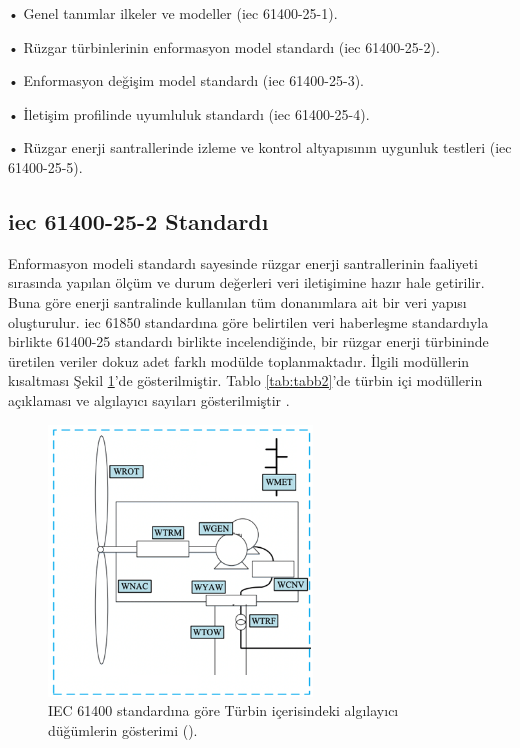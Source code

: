 •	Genel tanımlar ilkeler ve modeller (\gls{iec} 61400-25-1).

•	Rüzgar türbinlerinin enformasyon model standardı (\gls{iec} 61400-25-2).

•	Enformasyon değişim model standardı (\gls{iec} 61400-25-3).

•	İletişim profilinde uyumluluk standardı (\gls{iec} 61400-25-4).

•	Rüzgar enerji santrallerinde izleme ve kontrol altyapısının uygunluk testleri (\gls{iec} 61400-25-5).


\subsection{\gls{iec} 61400-25-2 Standardı}

Enformasyon modeli standardı sayesinde rüzgar enerji santrallerinin faaliyeti sırasında yapılan ölçüm ve durum değerleri veri iletişimine hazır hale getirilir. Buna göre enerji santralinde kullanılan tüm donanımlara ait bir veri yapısı oluşturulur. \gls{iec} 61850 standardına göre belirtilen veri haberleşme standardıyla birlikte 61400-25 standardı birlikte incelendiğinde, bir rüzgar enerji türbininde üretilen veriler dokuz adet farklı modülde toplanmaktadır. İlgili modüllerin kısaltması Şekil \ref{fig:figure15}’de gösterilmiştir. Tablo \ref{tab:tabb2}’de türbin içi modüllerin açıklaması ve algılayıcı sayıları gösterilmiştir \cite{francisco2016protection}\cite{trinnass}\cite{san2007use}.



\begin{figure}[htbp]
\centerline{\includegraphics[width=7cm]{Resim/Sekil4-1.png}}
\caption{IEC 61400 standardına göre Türbin içerisindeki  algılayıcı düğümlerin gösterimi (\protect{}).}
\label{fig:figure15}
\end{figure}

